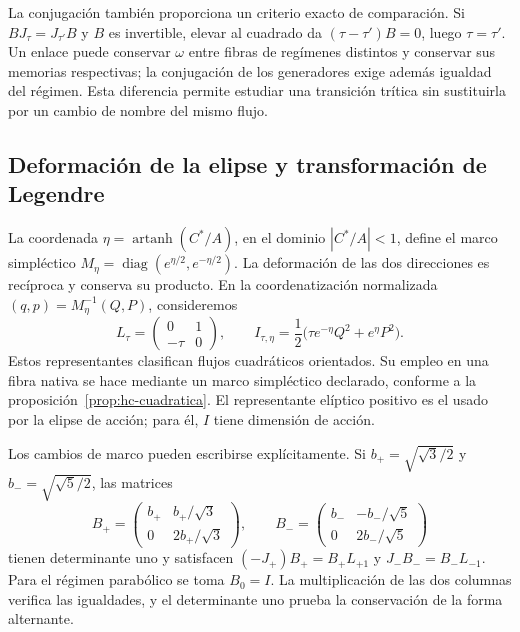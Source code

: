 La conjugación también proporciona un criterio exacto de comparación.
Si \(BJ_\tau=J_{\tau'}B\) y \(B\) es invertible, elevar al cuadrado
da \((\tau-\tau')B=0\), luego \(\tau=\tau'\). Un enlace puede
conservar \(\omega\) entre fibras de regímenes distintos y conservar
sus memorias respectivas; la conjugación de los generadores exige además
igualdad del régimen. Esta diferencia permite estudiar una transición
trítica sin sustituirla por un cambio de nombre del mismo flujo.

\subsection{Deformación de la elipse y transformación de Legendre}

La coordenada \(\eta=\operatorname{artanh}(C^*/A)\), en el dominio
\(|C^*/A|<1\), define el marco simpléctico
\(M_\eta=\operatorname{diag}(e^{\eta/2},e^{-\eta/2})\).
La deformación de las dos direcciones es recíproca y conserva su producto.
En la coordenatización normalizada \((q,p)=M_\eta^{-1}(Q,P)\), consideremos
\[
 L_\tau=\begin{pmatrix}0&1\\-\tau&0\end{pmatrix},\qquad
 I_{\tau,\eta}=\frac12\bigl(\tau e^{-\eta}Q^2+e^\eta P^2\bigr).
\]
Estos representantes clasifican flujos cuadráticos orientados. Su empleo
en una fibra nativa se hace mediante un marco simpléctico declarado,
conforme a la proposición~\ref{prop:hc-cuadratica}. El representante
elíptico positivo es el usado por la elipse de acción; para él, \(I\)
tiene dimensión de acción.

Los cambios de marco pueden escribirse explícitamente. Si
\(b_+=\sqrt{\sqrt3/2}\) y \(b_-=\sqrt{\sqrt5/2}\), las matrices
\[
 B_+=\begin{pmatrix}b_+&b_+/\sqrt3\\0&2b_+/\sqrt3\end{pmatrix},
 \qquad
 B_-=\begin{pmatrix}b_-&-b_-/\sqrt5\\0&2b_-/\sqrt5\end{pmatrix}
\]
tienen determinante uno y satisfacen
\( (-J_+)B_+=B_+L_{+1}\) y
\(J_-B_-=B_-L_{-1}\). Para el régimen parabólico se toma
\(B_0=I\). La multiplicación de las dos columnas verifica las
igualdades, y el determinante uno prueba la conservación de la forma
alternante.

